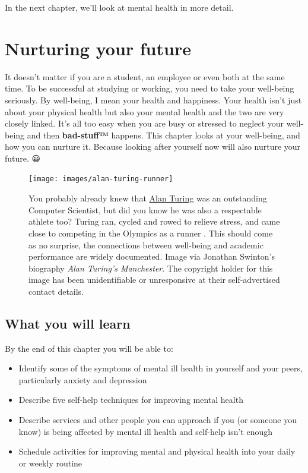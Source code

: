 \documentclass[
]{book}
\providecommand{\tightlist}{%
  \setlength{\itemsep}{0pt}\setlength{\parskip}{0pt}}
\begin{document}
In the next chapter, we'll look at mental health in more detail.

\hypertarget{nurturing}{%
\chapter{Nurturing your future}\label{nurturing}}

It doesn't matter if you are a student, an employee or even both at the same time. To be successful at studying or working, you need to take your well-being seriously. By well-being, I mean your health and happiness. Your health isn't just about your physical health but also your mental health and the two are very closely linked. It's all too easy when you are busy or stressed to neglect your well-being and then \textbf{bad-stuff™} happens. This chapter looks at your well-being, and how you can nurture it. Because looking after yourself now will also nurture your future. 😀

\begin{figure}

{\centering \texttt{[image: images/alan-turing-runner]} 

}

\caption{You probably already knew that \href{https://en.wikipedia.org/wiki/Alan_Turing}{Alan Turing} was an outstanding Computer Scientist, but did you know he was also a respectable athlete too? Turing ran, cycled and rowed to relieve stress, and came close to competing in the Olympics as a runner \citep{kottke}. This should come as no surprise, the connections between well-being and academic performance are widely documented. Image via Jonathan Swinton's biography \emph{Alan Turing's Manchester}. \citep{manturing} The copyright holder for this image has been unidentifiable or unresponsive at their self-advertised contact details.}\label{fig:turing-fig}
\end{figure}



\hypertarget{ilo3}{%
\section{What you will learn}\label{ilo3}}

By the end of this chapter you will be able to:

\begin{itemize}
\tightlist
\item
  Identify some of the symptoms of mental ill health in yourself and your peers, particularly anxiety and depression
\item
  Describe five self-help techniques for improving mental health
\item
  Describe services and other people you can approach if you (or someone you know) is being affected by mental ill health and self-help isn't enough
\item
  Schedule activities for improving mental and physical health into your daily or weekly routine
\end{itemize}
\end{document}

